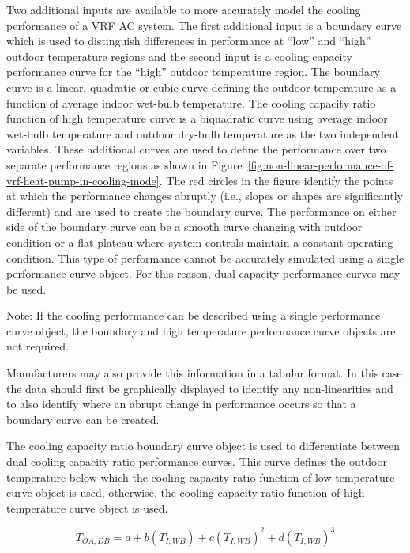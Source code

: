 Two additional inputs are available to more accurately model the cooling performance of a VRF AC system. The first additional input is a boundary curve which is used to distinguish differences in performance at ``low'' and ``high'' outdoor temperature regions and the second input is a cooling capacity performance curve for the ``high'' outdoor temperature region. The boundary curve is a linear, quadratic or cubic curve defining the outdoor temperature as a function of average indoor wet-bulb temperature. The cooling capacity ratio function of high temperature curve is a biquadratic curve using average indoor wet-bulb temperature and outdoor dry-bulb temperature as the two independent variables. These additional curves are used to define the performance over two separate performance regions as shown in Figure~\ref{fig:non-linear-performance-of-vrf-heat-pump-in-cooling-mode}. The red circles in the figure identify the points at which the performance changes abruptly (i.e., slopes or shapes are significantly different) and are used to create the boundary curve. The performance on either side of the boundary curve can be a smooth curve changing with outdoor condition or a flat plateau where system controls maintain a constant operating condition. This type of performance cannot be accurately simulated using a single performance curve object. For this reason, dual capacity performance curves may be used.

Note: If the cooling performance can be described using a single performance curve object, the boundary and high temperature performance curve objects are not required.

Manufacturers may also provide this information in a tabular format. In this case the data should first be graphically displayed to identify any non-linearities and to also identify where an abrupt change in performance occurs so that a boundary curve can be created.

The cooling capacity ratio boundary curve object is used to differentiate between dual cooling capacity ratio performance curves. This curve defines the outdoor temperature below which the cooling capacity ratio function of low temperature curve object is used, otherwise, the cooling capacity ratio function of high temperature curve object is used.

\begin{equation}
{T_{OA,DB}} = a + b\left( {{T_{I,WB}}} \right) + c{\left( {{T_{I,WB}}} \right)^2} + d{\left( {{T_{I,WB}}} \right)^3}
\end{equation}

